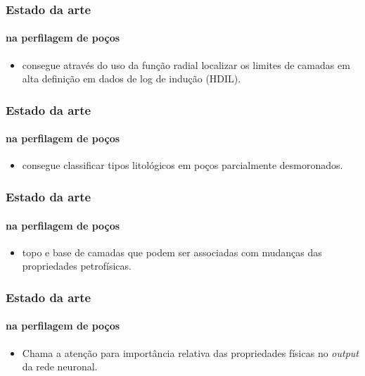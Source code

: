 \documentclass[aspectratio=10]{beamer} %
\begin{document}
\begin{frame}
\frametitle{Estado da arte}
\framesubtitle{na perfilagem de poços}
\begin{small}
\end{small}
\begin{itemize}
\item consegue através do uso da função radial localizar os limites de camadas em alta definição em dados de log de indução (HDIL).
\end{itemize}
\end{frame}

\begin{frame}
\frametitle{Estado da arte}
\framesubtitle{na perfilagem de poços}
\begin{small}
\end{small}
\begin{itemize}
\item consegue classificar tipos litológicos em poços parcialmente desmoronados.
\end{itemize}
\end{frame}

\begin{frame}
\frametitle{Estado da arte}
\framesubtitle{na perfilagem de poços}
\begin{small}
\end{small}
\begin{itemize}
\item topo e base de camadas que podem ser associadas com mudanças das propriedades petrofísicas. 
\end{itemize}
\end{frame}

\begin{frame}
\frametitle{Estado da arte}
\framesubtitle{na perfilagem de poços}
\begin{small}
\end{small}
\begin{itemize}
\item Chama a atenção para importância relativa das propriedades físicas no \textit{output} da rede neuronal. 
\end{itemize}
\end{frame}
\end{document}
